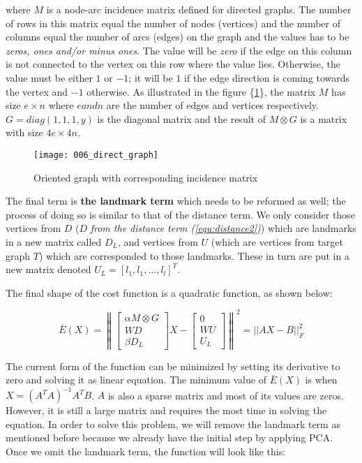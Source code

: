 \documentclass[../structure.tex]{subfiles}
\begin{document}
where $M$ is a node-arc incidence matrix defined for directed graphs. The number of rows in this matrix equal the number of nodes (vertices) and the number of columns equal the number of arcs (edges) on the graph and the values has to be \textit{zeros, ones and/or minus ones}. The value will be \textit{zero} if the edge on this column is not connected to the vertex on this row where the value lies. Otherwise, the value must be either $1$ or $-1$; it will be $1$ if the edge direction is coming towards the vertex and $-1$ otherwise. As illustrated in the figure \{\ref{fig:directed_graph}\}, the matrix $M$ has size $e\times n$ where $e and n$ are the number of edges and vertices respectively. $G = diag(1,1,1,y)$ is the diagonal matrix and the result of $M \otimes G$ is a matrix with size $4e \times 4n$.


\begin{figure}[h!]
\centering
\texttt{[image: 006\_direct\_graph]}
\captionsetup{justification=centering}
\caption{Oriented graph with corresponding incidence matrix  \cite{Wikipedia2010}}
\label{fig:directed_graph}
\end{figure}

The final term is \textbf{the landmark term} which needs to be reformed as well; the process of doing so is similar to that of the distance term. We only consider those vertices from $D$ ($D$ \textit{from the distance term (\ref{equ:distance2})}) which are landmarks in a new matrix called $D_{L}$, and vertices from $U$ (which are vertices from target graph $T$) which are corresponded to those landmarks. These in turn are put in a new matrix denoted $U_{L} = [l_{1}, l_{1}, \dots,l_{l}]^T$.

The final shape of the cost function is a quadratic function, as shown below:

\begin{equation}
\bar{E}(X) = \left\|
\begin{bmatrix}
\alpha M \otimes G \\ WD \\ \beta D_{L}
\end{bmatrix}
X -
\begin{bmatrix}
0 \\ WU \\ U_{L}
\end{bmatrix}
\right\| ^2 = ||AX - B||_{F}^2
\end{equation}

The current form of the function can be minimized by setting its derivative to zero and solving it as linear equation. The minimum value of $\bar{E}(X)$ is when $X = (A^T A)^{-1} A^T B$. $A$ is also a sparse matrix and most of its values are zeros. However, it is still a large matrix and requires the most time in solving the equation. In order to solve this problem, we will remove the landmark term as mentioned before because we already have the initial step by applying PCA. Once we omit the landmark term, the function will look like this:
\end{document}
